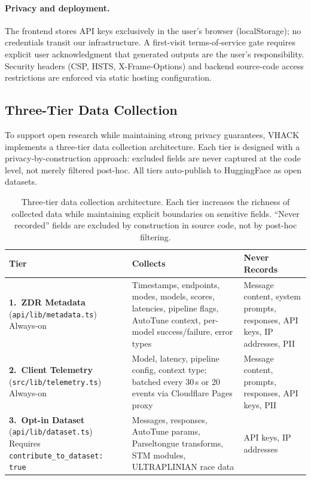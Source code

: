 \documentclass[11pt]{article}
\begin{document}
\paragraph{Privacy and deployment.} The frontend stores API keys exclusively in the user's browser (localStorage); no credentials transit our infrastructure. A first-visit terms-of-service gate requires explicit user acknowledgment that generated outputs are the user's responsibility. Security headers (CSP, HSTS, X-Frame-Options) and backend source-code access restrictions are enforced via static hosting configuration.

\subsection{Three-Tier Data Collection}
\label{sec:datacollection}

To support open research while maintaining strong privacy guarantees, VHACK implements a three-tier data collection architecture. Each tier is designed with a privacy-by-construction approach: excluded fields are never captured at the code level, not merely filtered post-hoc. All tiers auto-publish to HuggingFace as open datasets.

\begin{table}[t]
\caption{Three-tier data collection architecture. Each tier increases the richness of collected data while maintaining explicit boundaries on sensitive fields. ``Never recorded'' fields are excluded by construction in source code, not by post-hoc filtering.}
\label{tab:datacollection}
\centering
\small
\begin{tabular}{@{}p{2.4cm}p{4.2cm}p{4.2cm}@{}}
\toprule
Tier & Collects & Never Records \\
\midrule
\textbf{1.\ ZDR Metadata} \newline (\texttt{api/lib/metadata.ts}) \newline Always-on &
Timestamps, endpoints, modes, models, scores, latencies, pipeline flags, AutoTune context, per-model success/failure, error types &
Message content, system prompts, responses, API keys, IP addresses, PII \\
\midrule
\textbf{2.\ Client Telemetry} \newline (\texttt{src/lib/telemetry.ts}) \newline Always-on &
Model, latency, pipeline config, context type; batched every 30\,s or 20 events via Cloudflare Pages proxy &
Message content, prompts, responses, API keys, PII \\
\midrule
\textbf{3.\ Opt-in Dataset} \newline (\texttt{api/lib/dataset.ts}) \newline Requires \texttt{contribute\_to\_dataset: true} &
Messages, responses, AutoTune params, Parseltongue transforms, STM modules, ULTRAPLINIAN race data &
API keys, IP addresses \\
\bottomrule
\end{tabular}
\end{table}
\end{document}
